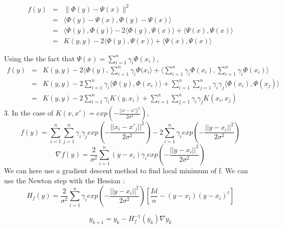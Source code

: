 \begin{eqnarray*}
	f(y) &=& \|\Phi(y) - \Psi(x) \|^2\\
	&=& \langle \Phi(y) - \Psi(x), \Phi(y) - \Psi(x) \rangle \\
	&=& \langle \Phi(y), \Phi(y) \rangle -  2 \langle \Phi(y), \Psi(x) \rangle + \langle \Psi(x), \Psi(x) \rangle\\
	&=& K(y,y) -  2 \langle \Phi(y), \Psi(x) \rangle + \langle \Psi(x), \Psi(x) \rangle
\end{eqnarray*}

Using the the fact that $\Psi(x) = \sum_{i=1}^n \gamma_i \Phi(x_i)$,
\begin{eqnarray*}
	f(y) &=& K(y,y) - 2\langle \Phi(y), \sum_{i=1}^n \gamma_i \Phi(x_i \rangle + \langle \sum_{i=1}^n \gamma_i \Phi(x_i), \sum_{i=1}^n \gamma_i \Phi(x_i) \rangle \\
	&=& K(y,y) - 2\sum_{i=1}^n \gamma_i \langle \Phi(y), \Phi(x_i) \rangle + \sum_{i=1}^n \sum_{j=1}^n \gamma_i\gamma_j\langle  \Phi(x_i),  \Phi(x_j) \rangle \\
	&=& K(y,y) - 2\sum_{i=1}^n \gamma_i K(y,x_i) + \sum_{i=1}^n \sum_{j=1}^n \gamma_i\gamma_j K(x_i,x_j)
\end{eqnarray*}
3. In the case of $K(x,x')=exp(-\frac{||x-x'||^{2}}{2\sigma^{2}})$,
$$f(y)=\sum_{i=1}^{n}\sum_{j=1}^{n}\gamma_{i}\gamma_{j}exp(-\frac{||x_{i}-x'_{j}||^{2}}{2\sigma^{2}})-2\sum_{i=1}^{n}\gamma_{i}exp(-\frac{||y-x_{i}||^{2}}{2\sigma^{2}})$$
$$\nabla f(y)=\frac{2}{\sigma^{2}}\sum_{i=1}^{n}(y-x_{i})\gamma_{i}exp(-\frac{||y-x_{i}||^{2}}{2\sigma^{2}})$$
We can here use a gradient descent method to find local minimum of f. We can use the Newton step with the Hessian :
$$H_{f}(y)=\frac{2}{\sigma^{2}} \sum_{i=1}^{n}\gamma_{i}exp(-\frac{||y-x_{i}||^{2}}{2\sigma^{2}})[\frac{Id}{n}-(y-x_{i})(y-x_{i})^{t} ]$$

$$y_{k+1}=y_{k}-H_{f}^{-1}(y_{k})\nabla y_{k}$$

